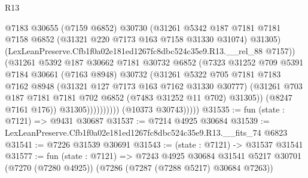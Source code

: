 \begin{lexlean}{R13}
\begin{coremodule}
                                @7183
                                @30655
                                (@7159 @6852)
                                @30730
                                (@31261
                                  @5342
                                  @187
                                  @7181
                                  @7181
                                  @7158
                                  @6852
                                  (@31321 @220 @7173 @163 @7158 @31330 @31074)
                                  @31305)
                                (LexLeanPreserve.Cfb1f0a02e181ed1267fc8dbc524c35e9.R13.__rel_88
                                  @7157))
                              (@31261
                                @5392
                                @187
                                @30662
                                @7181
                                @30732
                                @6852
                                (@7323
                                  @31252
                                  @709
                                  @5391
                                  @7184
                                  @30661
                                  (@7163 @8948)
                                  @30732
                                  (@31261
                                    @5322
                                    @705
                                    @7181
                                    @7183
                                    @7162
                                    @8948
                                    (@31321 @127 @7173 @163 @7162 @31330 @30777)
                                    (@31261
                                      @703
                                      @187
                                      @7181
                                      @7181
                                      @702
                                      @6852
                                      (@7483 @31252 @11 @702)
                                      @31305))
                                  (@8247 @7161 @176))
                                @31305))))))))))
            (@10373 @30743)))))
@31535 := fun (state : @7121) => @9431 @30687
@31537 := @7214 @4925 @30684
@31539 := LexLeanPreserve.Cfb1f0a02e181ed1267fc8dbc524c35e9.R13.__fits_74 @6823
@31541 := @7226 @31539 @30691
@31543 := (state : @7121) -> @31537 @31541
@31577 := fun (state : @7121) =>
  @7243
    @4925
    @30684
    @31541
    @5217
    @30701
    (@7270 (@7280 @4925))
    (@7286 (@7287 (@7288 @5217) @30684 @7263))

\end{coremodule}
\end{lexlean}
